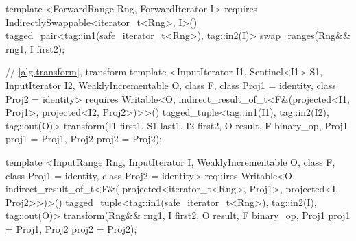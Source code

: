 \begin{codeblock}
template <ForwardRange Rng, ForwardIterator I>
  requires IndirectlySwappable<iterator_t<Rng>, I>()
  tagged_pair<tag::in1(safe_iterator_t<Rng>), tag::in2(I)>
    swap_ranges(Rng&& rng1, I first2);

// \ref{alg.transform}, transform
template <InputIterator I1, Sentinel<I1> S1, InputIterator I2, WeaklyIncrementable O,
    class F, class Proj1 = identity, class Proj2 = identity>
  requires Writable<O, indirect_result_of_t<F&(projected<I1, Proj1>, projected<I2, Proj2>)>>()
  tagged_tuple<tag::in1(I1), tag::in2(I2), tag::out(O)>
    transform(I1 first1, S1 last1, I2 first2, O result,
              F binary_op, Proj1 proj1 = Proj1{}, Proj2 proj2 = Proj2{});

template <InputRange Rng, InputIterator I, WeaklyIncrementable O, class F,
    class Proj1 = identity, class Proj2 = identity>
  requires Writable<O, indirect_result_of_t<F&(
    projected<iterator_t<Rng>, Proj1>, projected<I, Proj2>>)>()
  tagged_tuple<tag::in1(safe_iterator_t<Rng>), tag::in2(I), tag::out(O)>
    transform(Rng&& rng1, I first2, O result,
              F binary_op, Proj1 proj1 = Proj1{}, Proj2 proj2 = Proj2{});
\end{codeblock}
